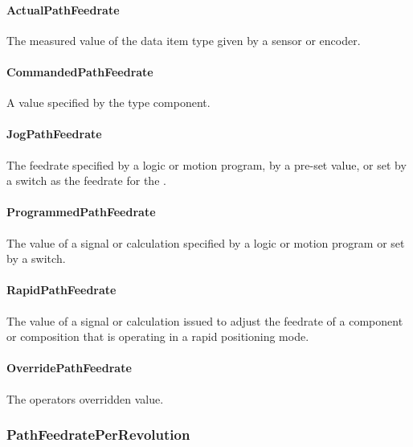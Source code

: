 \paragraph{ActualPathFeedrate}\mbox{}
\label{sec:ActualPathFeedrate}


The measured value of the data item type given by a sensor or encoder.


\paragraph{CommandedPathFeedrate}\mbox{}
\label{sec:CommandedPathFeedrate}


A value specified by the  type component.


\paragraph{JogPathFeedrate}\mbox{}
\label{sec:JogPathFeedrate}


The feedrate specified by a logic or motion program, by a pre-set value, or set by a switch as the feedrate for the . 


\paragraph{ProgrammedPathFeedrate}\mbox{}
\label{sec:ProgrammedPathFeedrate}


The value of a signal or calculation specified by a logic or motion program or set by a switch.


\paragraph{RapidPathFeedrate}\mbox{}
\label{sec:RapidPathFeedrate}


The value of a signal or calculation issued to adjust the feedrate of a component or composition that is operating in a rapid positioning mode.


\paragraph{OverridePathFeedrate}\mbox{}
\label{sec:OverridePathFeedrate}


The operators overridden value.


\subsubsection{PathFeedratePerRevolution}
\label{sec:PathFeedratePerRevolution}



